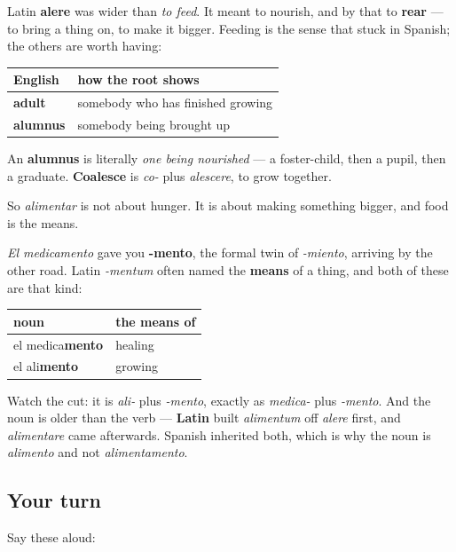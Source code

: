 \begin{cousinweb}
Latin \textbf{alere} was wider than \emph{to feed}. It meant to nourish, and by that to \textbf{rear} — to bring a thing on, to make it bigger. Feeding is the sense that stuck in Spanish; the others are worth having:

\noindent
\begin{tabularx}{\linewidth}{@{}>{\raggedright\arraybackslash}X>{\raggedright\arraybackslash}X@{}}
\toprule
\textbf{English} & \textbf{how the root shows} \\
\midrule
\textbf{adult} & somebody who has finished growing \\
\textbf{alumnus} & somebody being brought up \\
\bottomrule
\end{tabularx}

An \textbf{alumnus} is literally \emph{one being nourished} — a foster-child, then a pupil, then a graduate. \textbf{Coalesce} is \emph{co-} plus \emph{alescere}, to grow together.

So \emph{alimentar} is not about hunger. It is about making something bigger, and food is the means.
\end{cousinweb}

\begin{grammarlens}[title={Grammar Lens: -mento, and the noun it builds here}]
\emph{El medicamento} gave you \textbf{-mento}, the formal twin of \emph{-miento}, arriving by the other road. Latin \emph{-mentum} often named the \textbf{means} of a thing, and both of these are that kind:

\noindent
\begin{tabularx}{\linewidth}{@{}>{\raggedright\arraybackslash}X>{\raggedright\arraybackslash}X@{}}
\toprule
\textbf{noun} & \textbf{the means of} \\
\midrule
el medica\textbf{mento} & healing \\
el ali\textbf{mento} & growing \\
\bottomrule
\end{tabularx}

Watch the cut: it is \emph{ali-} plus \emph{-mento}, exactly as \emph{medica-} plus \emph{-mento}. And the noun is older than the verb — \textbf{Latin} built \emph{alimentum} off \emph{alere} first, and \emph{alimentare} came afterwards. Spanish inherited both, which is why the noun is \emph{alimento} and not \emph{alimentamento}.
\end{grammarlens}

\subsection*{Your turn}
Say these aloud:

